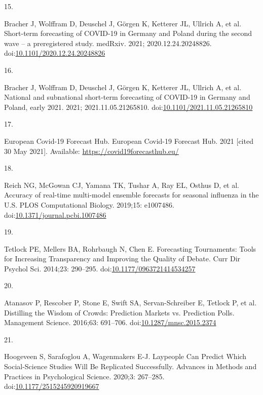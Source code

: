 \documentclass[10pt,letterpaper]{article}
\newlength{\cslhangindent}
\newlength{\csllabelwidth}
\newlength{\cslentryspacingunit} %
\newenvironment{CSLReferences}[2] %
 {%
  \setlength{\parindent}{0pt}
  \ifodd #1
  \let\oldpar\par
  \def\par{\hangindent=\cslhangindent\oldpar}
  \fi
  \setlength{\parskip}{#2\cslentryspacingunit}
 }%
 {}
\newcommand{\CSLLeftMargin}[1]{\parbox[t]{\csllabelwidth}{#1}}
\newcommand{\CSLRightInline}[1]{\parbox[t]{\linewidth - \csllabelwidth}{#1}\break}
\begin{document}
\begin{CSLReferences}{0}{0}
\leavevmode{}%
\CSLLeftMargin{15. }%
\CSLRightInline{Bracher J, Wolffram D, Deuschel J, Görgen K, Ketterer
JL, Ullrich A, et al. Short-term forecasting of {COVID-19} in {Germany}
and {Poland} during the second wave -- a preregistered study. medRxiv.
2021; 2020.12.24.20248826.
doi:\href{https://doi.org/10.1101/2020.12.24.20248826}{10.1101/2020.12.24.20248826}}

\leavevmode{}%
\CSLLeftMargin{16. }%
\CSLRightInline{Bracher J, Wolffram D, Deuschel J, Görgen K, Ketterer
JL, Ullrich A, et al. National and subnational short-term forecasting of
{COVID-19} in {Germany} and {Poland}, early 2021. 2021;
2021.11.05.21265810.
doi:\href{https://doi.org/10.1101/2021.11.05.21265810}{10.1101/2021.11.05.21265810}}

\leavevmode{}%
\CSLLeftMargin{17. }%
\CSLRightInline{European Covid-19 Forecast Hub. European {Covid-19
Forecast Hub}. 2021 {[}cited 30 May 2021{]}. Available:
\url{https://covid19forecasthub.eu/}}

\leavevmode{}%
\CSLLeftMargin{18. }%
\CSLRightInline{Reich NG, McGowan CJ, Yamana TK, Tushar A, Ray EL,
Osthus D, et al. Accuracy of real-time multi-model ensemble forecasts
for seasonal influenza in the {U}.{S}. PLOS Computational Biology.
2019;15: e1007486.
doi:\href{https://doi.org/10.1371/journal.pcbi.1007486}{10.1371/journal.pcbi.1007486}}

\leavevmode{}%
\CSLLeftMargin{19. }%
\CSLRightInline{Tetlock PE, Mellers BA, Rohrbaugh N, Chen E. Forecasting
{Tournaments}: {Tools} for {Increasing Transparency} and {Improving} the
{Quality} of {Debate}. Curr Dir Psychol Sci. 2014;23: 290--295.
doi:\href{https://doi.org/10.1177/0963721414534257}{10.1177/0963721414534257}}

\leavevmode{}%
\CSLLeftMargin{20. }%
\CSLRightInline{Atanasov P, Rescober P, Stone E, Swift SA,
Servan-Schreiber E, Tetlock P, et al. Distilling the {Wisdom} of
{Crowds}: {Prediction Markets} vs. {Prediction Polls}. Management
Science. 2016;63: 691--706.
doi:\href{https://doi.org/10.1287/mnsc.2015.2374}{10.1287/mnsc.2015.2374}}

\leavevmode{}%
\CSLLeftMargin{21. }%
\CSLRightInline{Hoogeveen S, Sarafoglou A, Wagenmakers E-J. Laypeople
{Can Predict Which Social-Science Studies Will Be Replicated
Successfully}. Advances in Methods and Practices in Psychological
Science. 2020;3: 267--285.
doi:\href{https://doi.org/10.1177/2515245920919667}{10.1177/2515245920919667}}


\end{CSLReferences}
\end{document}
